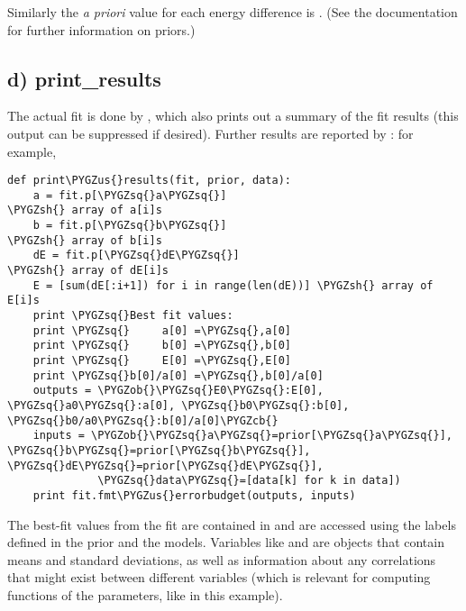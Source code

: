\documentclass[letterpaper,10pt,english]{sphinxmanual}
\def\PYGZus{\char`\_}
\def\PYGZob{\char`\{}
\def\PYGZcb{\char`\}}
\def\PYGZsh{\char`\#}
\def\PYGZsq{\char`\'}
\begin{document}
Similarly the \emph{a priori} value for each energy difference is .
(See the  documentation for further information on priors.)


\subsection{d) print\_results}
\label{corrfitter:d-print-results}
The actual fit is done by , which also prints out
a summary of the fit results (this output can be suppressed if desired).
Further results are reported by : for
example,

\begin{Verbatim}[commandchars=\\\{\}]
def print\PYGZus{}results(fit, prior, data):
    a = fit.p[\PYGZsq{}a\PYGZsq{}]                              \PYGZsh{} array of a[i]s
    b = fit.p[\PYGZsq{}b\PYGZsq{}]                              \PYGZsh{} array of b[i]s
    dE = fit.p[\PYGZsq{}dE\PYGZsq{}]                            \PYGZsh{} array of dE[i]s
    E = [sum(dE[:i+1]) for i in range(len(dE))] \PYGZsh{} array of E[i]s
    print \PYGZsq{}Best fit values:
    print \PYGZsq{}     a[0] =\PYGZsq{},a[0]
    print \PYGZsq{}     b[0] =\PYGZsq{},b[0]
    print \PYGZsq{}     E[0] =\PYGZsq{},E[0]
    print \PYGZsq{}b[0]/a[0] =\PYGZsq{},b[0]/a[0]
    outputs = \PYGZob{}\PYGZsq{}E0\PYGZsq{}:E[0], \PYGZsq{}a0\PYGZsq{}:a[0], \PYGZsq{}b0\PYGZsq{}:b[0], \PYGZsq{}b0/a0\PYGZsq{}:b[0]/a[0]\PYGZcb{}
    inputs = \PYGZob{}\PYGZsq{}a\PYGZsq{}=prior[\PYGZsq{}a\PYGZsq{}], \PYGZsq{}b\PYGZsq{}=prior[\PYGZsq{}b\PYGZsq{}], \PYGZsq{}dE\PYGZsq{}=prior[\PYGZsq{}dE\PYGZsq{}],
              \PYGZsq{}data\PYGZsq{}=[data[k] for k in data])
    print fit.fmt\PYGZus{}errorbudget(outputs, inputs)
\end{Verbatim}

The best-fit values from the fit are contained in  and are accessed
using the labels defined in the prior and the {\hyperref[corrfitter:corrfitter.Corr2]{}} models. Variables like
 and  are  objects that contain means and standard
deviations, as well as information about any correlations that might exist
between different variables (which is relevant for computing functions of the
parameters, like  in this example).
\end{document}
